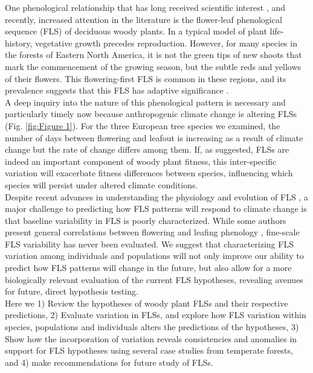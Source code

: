 \documentclass[12pt]{article}
\begin{document}
\indent One phenological relationship that has long received scientific interest \citep[see][]{Robertson1895}, and recently, increased attention in the literature \citep{Savage2019, Gougherty2018} is the flower-leaf phenological sequence (FLS) of deciduous woody plants. In a typical model of plant life-history, vegetative growth precedes reproduction. However, for many species in the forests of Eastern North America, it is not the green tips of new shoots that mark the commencement of the growing season, but the subtle reds and yellows of their flowers. This flowering-first FLS is common in these regions, and its prevalence suggests that this FLS has adaptive significance \citep{Rathcke_1985}.\\ 

\indent A deep inquiry into the nature of this phenological pattern is necessary and particularly timely now because anthropogenic climate change is altering FLSs (Fig. \ref{fig:Figure 1}). For the three European tree species we examined, the number of days between flowering and leafout is increasing as a result of climate change but the rate of change differs among them.  If, as suggested, FLSs are indeed an important component of woody plant fitness, this inter-specific variation will exacerbate fitness differences between species, influencing which species will persist under altered climate conditions.\\

\indent Despite recent advances in understanding the physiology and evolution of FLS \citep{Gougherty2018,Savage2019}, a major challenge to predicting how FLS patterns will respond to climate change is that baseline variability in FLS is poorly characterized. While some authors present general correlations between flowering and leafing phenology \citep{Lechowicz_1995, Ettinger2018}, fine-scale FLS variability has never been evaluated. We suggest that characterizing FLS variation among individuals and populations will not only improve our ability to predict how FLS patterns will change in the future, but also allow for a more biologically relevant evaluation of the current FLS hypotheses, revealing avenues for future, direct hypothesis testing.\\

\indent Here we 1) Review the hypotheses of woody plant FLSs and their respective predictions, 2) Evaluate variation in FLSs, and explore how FLS variation within species, populations and individuals alters the predictions of the hypotheses, 3) Show how the incorporation of variation reveals consistencies and anomalies in support for FLS hypotheses using several case studies from temperate forests, and 4) make recommendations for future study of FLSs. 
\end{document}
